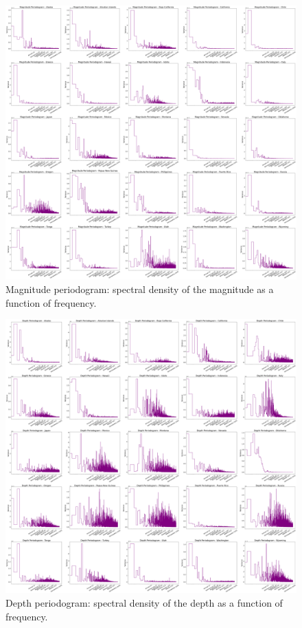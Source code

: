 \begin{figure}[hbtp]
    \centering
    \includegraphics[scale=0.15]{img/magnitude-periodogram.png}
    \captionsetup{format=hang}
    \caption{\label{fig:mag-periodogram}Magnitude periodogram:
        spectral density of the magnitude as a function of frequency.}
\end{figure}

\begin{figure}[hbtp]
    \centering
    \includegraphics[scale=0.15]{img/depth-periodogram.png}
    \captionsetup{format=hang}
    \caption{\label{fig:depth-periodogram}Depth periodogram:
        spectral density of the depth as a function of frequency.}
\end{figure}

